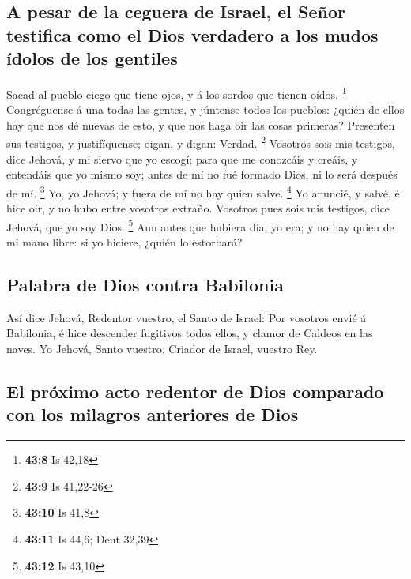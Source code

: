 \hypertarget{a-pesar-de-la-ceguera-de-israel-el-seuxf1or-testifica-como-el-dios-verdadero-a-los-mudos-uxeddolos-de-los-gentiles}{%
\subsection{A pesar de la ceguera de Israel, el Señor testifica como el
Dios verdadero a los mudos ídolos de los
gentiles}\label{a-pesar-de-la-ceguera-de-israel-el-seuxf1or-testifica-como-el-dios-verdadero-a-los-mudos-uxeddolos-de-los-gentiles}}

 Sacad al pueblo ciego que tiene ojos, y á los sordos que
tienen oídos. \footnote{\textbf{43:8} Is 42,18} 
Congréguense á una todas las gentes, y júntense todos los pueblos:
¿quién de ellos hay que nos dé nuevas de esto, y que nos haga oir las
cosas primeras? Presenten sus testigos, y justifíquense; oigan, y digan:
Verdad. \footnote{\textbf{43:9} Is 41,22-26}  Vosotros sois
mis testigos, dice Jehová, y mi siervo que yo escogí; para que me
conozcáis y creáis, y entendáis que yo mismo soy; antes de mí no fué
formado Dios, ni lo será después de mí. \footnote{\textbf{43:10} Is 41,8}
 Yo, yo Jehová; y fuera de mí no hay quien salve.
\footnote{\textbf{43:11} Is 44,6; Deut 32,39}  Yo anuncié,
y salvé, é hice oir, y no hubo entre vosotros extraño. Vosotros pues
sois mis testigos, dice Jehová, que yo soy Dios. \footnote{\textbf{43:12}
  Is 43,10}  Aun antes que hubiera día, yo era; y no hay
quien de mi mano libre: si yo hiciere, ¿quién lo estorbará?

\hypertarget{palabra-de-dios-contra-babilonia}{%
\subsection{Palabra de Dios contra
Babilonia}\label{palabra-de-dios-contra-babilonia}}

 Así dice Jehová, Redentor vuestro, el Santo de Israel: Por
vosotros envié á Babilonia, é hice descender fugitivos todos ellos, y
clamor de Caldeos en las naves.  Yo Jehová, Santo vuestro,
Criador de Israel, vuestro Rey.

\hypertarget{el-pruxf3ximo-acto-redentor-de-dios-comparado-con-los-milagros-anteriores-de-dios}{%
\subsection{El próximo acto redentor de Dios comparado con los milagros
anteriores de
Dios}\label{el-pruxf3ximo-acto-redentor-de-dios-comparado-con-los-milagros-anteriores-de-dios}}

